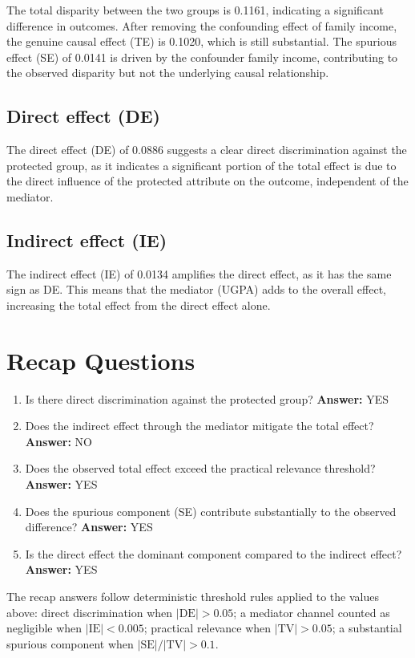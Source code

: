 \documentclass[11pt]{article}
\begin{document}
The total disparity between the two groups is 0.1161, indicating a significant difference in outcomes. After removing the confounding effect of family income, the genuine causal effect (TE) is 0.1020, which is still substantial. The spurious effect (SE) of 0.0141 is driven by the confounder family income, contributing to the observed disparity but not the underlying causal relationship.

\subsection{Direct effect (DE)}

The direct effect (DE) of 0.0886 suggests a clear direct discrimination against the protected group, as it indicates a significant portion of the total effect is due to the direct influence of the protected attribute on the outcome, independent of the mediator.

\subsection{Indirect effect (IE)}

The indirect effect (IE) of 0.0134 amplifies the direct effect, as it has the same sign as DE. This means that the mediator (UGPA) adds to the overall effect, increasing the total effect from the direct effect alone.

\section{Recap Questions}

\begin{enumerate}
\item Is there direct discrimination against the protected group? \textbf{Answer:} YES
\item Does the indirect effect through the mediator mitigate the total effect? \textbf{Answer:} NO
\item Does the observed total effect exceed the practical relevance threshold? \textbf{Answer:} YES
\item Does the spurious component (SE) contribute substantially to the observed difference? \textbf{Answer:} YES
\item Is the direct effect the dominant component compared to the indirect effect? \textbf{Answer:} YES
\end{enumerate}

\vspace{1em}
\noindent\footnotesize
The recap answers follow deterministic threshold rules applied to the values above: direct discrimination when $|\mathrm{DE}| > 0.05$; a mediator channel counted as negligible when $|\mathrm{IE}| < 0.005$; practical relevance when $|\mathrm{TV}| > 0.05$; a substantial spurious component when $|\mathrm{SE}| / |\mathrm{TV}| > 0.1$.
\end{document}
